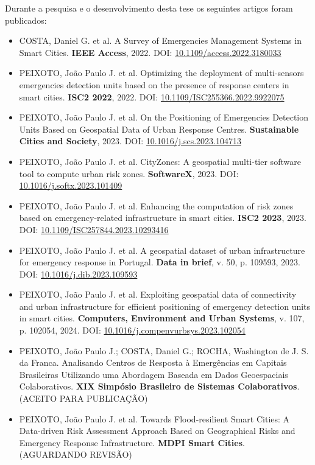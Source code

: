\begin{refsection}
Durante a pesquisa e o desenvolvimento desta tese os seguintes artigos foram publicados:

\begin{itemize}
  \item COSTA, Daniel G. et al. A Survey of Emergencies Management Systems in Smart Cities. \textbf{IEEE Access}, 2022. DOI: \hyperref{https://doi.org/10.1109/access.2022.3180033}{}{}{10.1109/access.2022.3180033}
  \item PEIXOTO, João Paulo J. et al. Optimizing the deployment of multi-sensors emergencies detection units based on the presence of response centers in smart cities. \textbf{ISC2 2022}, 2022. DOI: \hyperref{https://doi.org/10.1109/ISC255366.2022.9922075}{}{}{10.1109/ISC255366.2022.9922075}
  \item PEIXOTO, João Paulo J. et al. On the Positioning of Emergencies Detection Units Based on Geospatial Data of Urban Response Centres. \textbf{Sustainable Cities and Society}, 2023. DOI: \hyperref{https://doi.org/10.1016/j.scs.2023.104713}{}{}{10.1016/j.scs.2023.104713}
  \item PEIXOTO, João Paulo J. et al. CityZones: A geospatial multi-tier software tool to compute urban risk zones. \textbf{SoftwareX}, 2023. DOI: \hyperref{https://doi.org/10.1016/j.softx.2023.101409}{}{}{10.1016/j.softx.2023.101409}
  \item PEIXOTO, João Paulo J. et al. Enhancing the computation of risk zones based on emergency-related infrastructure in smart cities. \textbf{ISC2 2023}, 2023. DOI: \hyperref{https://doi.org/10.1109/ISC257844.2023.10293416}{}{}{10.1109/ISC257844.2023.10293416}
  \item PEIXOTO, João Paulo J. et al. A geospatial dataset of urban infrastructure for emergency response in Portugal. \textbf{Data in brief}, v. 50, p. 109593, 2023. DOI: \hyperref{https://doi.org/10.1016/j.dib.2023.109593}{}{}{10.1016/j.dib.2023.109593}
  \item PEIXOTO, João Paulo J. et al. Exploiting geospatial data of connectivity and urban infrastructure for efficient positioning of emergency detection units in smart cities. \textbf{Computers, Environment and Urban Systems}, v. 107, p. 102054, 2024. DOI: \hyperref{https://doi.org/10.1016/j.compenvurbsys.2023.102054}{}{}{10.1016/j.compenvurbsys.2023.102054}
  \item PEIXOTO, João Paulo J.; COSTA, Daniel G.; ROCHA, Washington de J. S. da Franca. Analisando Centros de Resposta à Emergências em Capitais Brasileiras Utilizando uma Abordagem Baseada em Dados Geoespaciais Colaborativos. \textbf{XIX Simpósio Brasileiro de Sistemas Colaborativos}. (ACEITO PARA PUBLICAÇÃO)
  \item PEIXOTO, João Paulo J. et al. Towards Flood-resilient Smart Cities: A Data-driven Risk Assessment Approach Based on Geographical Risks and Emergency Response Infrastructure. \textbf{MDPI Smart Cities}. (AGUARDANDO REVISÃO)
\end{itemize}


\end{refsection}
